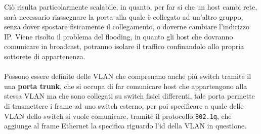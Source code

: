 \documentclass[12pt, letterpaper]{article}
\newcommand{\codee}[1]{\colorbox{white}{\texttt{#1}}}
\newcommand{\acc}{\\\hphantom{}\\}
\begin{document}
Ciò risulta particolarmente scalabile, in quanto, per far si che un host cambi rete, sarà necessario riassegnare la 
porta alla quale è collegato ad un'altro gruppo, senza dover spostare fisicamente il collegamento, o doverne cambiare 
l'indirizzo IP. Viene risolto il problema del flooding, in quanto gli host che dovranno comunicare in broadcast, potranno 
isolare il traffico confinandolo allo propria sottorete di appartenenza.\acc 
Possono essere definite delle VLAN che comprenano anche più switch tramite il una \textbf{porta trunk}, che si occupa 
di far comunicare host che appartengono alla stessa VLAN ma che sono collegati su switch fisici differenti, tale porta permette 
di trasmettere i frame ad uno switch esterno, per poi specificare a quale delle VLAN dello switch si vuole comunicare, tramite 
il protocollo \codee{802.1q}, che aggiunge al frame Ethernet la specifica riguardo l'id della VLAN in questione.
\end{document}
